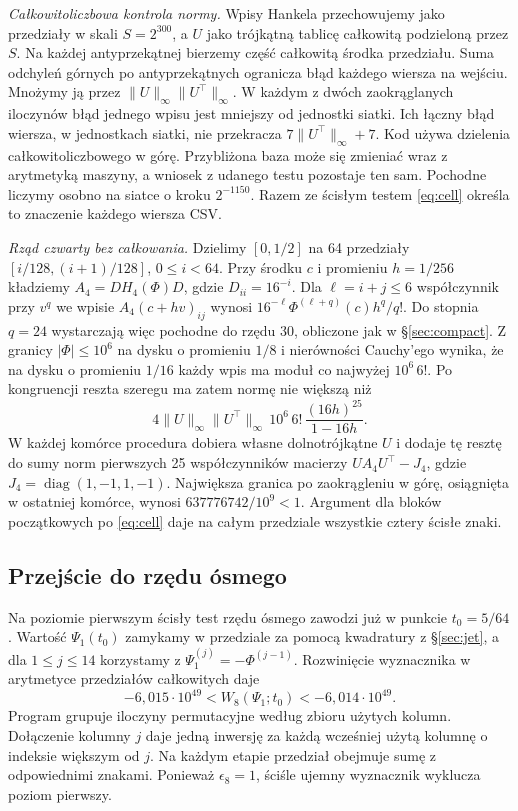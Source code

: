 \documentclass[11pt,a4paper,reqno]{amsart}
\numberwithin{equation}{section}
\begin{document}
\textit{Całkowitoliczbowa kontrola normy.} Wpisy Hankela przechowujemy jako przedziały w skali \(S=2^{300}\), a \(U\) jako trójkątną tablicę całkowitą podzieloną przez \(S\). Na każdej antyprzekątnej bierzemy część całkowitą środka przedziału. Suma odchyleń górnych po antyprzekątnych ogranicza błąd każdego wiersza na wejściu. Mnożymy ją przez \(\|U\|_\infty\|U^\top\|_\infty\). W każdym z dwóch zaokrąglanych iloczynów błąd jednego wpisu jest mniejszy od jednostki siatki. Ich łączny błąd wiersza, w jednostkach siatki, nie przekracza \(7\|U^\top\|_\infty+7\). Kod używa dzielenia całkowitoliczbowego w górę. Przybliżona baza może się zmieniać wraz z arytmetyką maszyny, a wniosek z udanego testu pozostaje ten sam. Pochodne liczymy osobno na siatce o kroku \(2^{-1150}\). Razem ze ścisłym testem \eqref{eq:cell} określa to znaczenie każdego wiersza CSV.

\textit{Rząd czwarty bez całkowania.}
Dzielimy \([0,1/2]\) na 64 przedziały \([i/128,(i+1)/128]\), \(0\le i<64\). Przy środku \(c\) i promieniu \(h=1/256\) kładziemy \(A_4=DH_4(\Phi)D\), gdzie \(D_{ii}=16^{-i}\). Dla \(\ell=i+j\le6\) współczynnik przy \(v^q\) we wpisie \(A_4(c+hv)_{ij}\) wynosi \(16^{-\ell}\Phi^{(\ell+q)}(c)h^q/q!\). Do stopnia \(q=24\) wystarczają więc pochodne do rzędu 30, obliczone jak w \S\ref{sec:compact}. Z granicy \(|\Phi|\le10^6\) na dysku o promieniu \(1/8\) i nierówności Cauchy'ego wynika, że na dysku o promieniu \(1/16\) każdy wpis ma moduł co najwyżej \(10^6\,6!\). Po kongruencji reszta szeregu ma zatem normę nie większą niż
\[
4\|U\|_\infty\|U^\top\|_\infty\,10^6\,6!\,
\frac{(16h)^{25}}{1-16h}.
\]
W każdej komórce procedura dobiera własne dolnotrójkątne \(U\) i dodaje tę resztę do sumy norm pierwszych 25 współczynników macierzy \(UA_4U^\top-J_4\), gdzie \(J_4=\operatorname{diag}(1,-1,1,-1)\). Największa granica po zaokrągleniu w górę, osiągnięta w ostatniej komórce, wynosi \(637776742/10^9<1\). Argument dla bloków początkowych po \eqref{eq:cell} daje na całym przedziale wszystkie cztery ścisłe znaki.

\subsection{Przejście do rzędu ósmego}\label{sec:eight}

Na poziomie pierwszym ścisły test rzędu ósmego zawodzi już w punkcie \(t_0=5/64\). Wartość \(\Psi_1(t_0)\) zamykamy w przedziale za pomocą kwadratury z \S\ref{sec:jet}, a dla \(1\le j\le14\) korzystamy z \(\Psi_1^{(j)}=-\Phi^{(j-1)}\). Rozwinięcie wyznacznika w arytmetyce przedziałów całkowitych daje
\[
 -6{,}015\cdot10^{49}<W_8(\Psi_1;t_0)<-6{,}014\cdot10^{49}.
\]
Program grupuje iloczyny permutacyjne według zbioru użytych kolumn. Dołączenie kolumny \(j\) daje jedną inwersję za każdą wcześniej użytą kolumnę o indeksie większym od \(j\). Na każdym etapie przedział obejmuje sumę z odpowiednimi znakami. Ponieważ \(\epsilon_8=1\), ściśle ujemny wyznacznik wyklucza poziom pierwszy.
\end{document}
